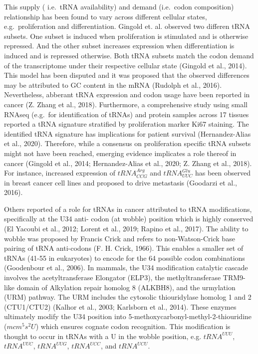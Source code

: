 \documentclass[12pt,openany]{book}
\begin{document}
This supply ( i.e.~tRNA availability) and demand (i.e.~codon
composition) relationship has been found to vary across different
cellular states, e.g.~proliferation and differentiation. Gingold et. al.
observed two differen tRNA subsets. One subset is induced when
proliferation is stimulated and is otherwise repressed. And the other
subset increases expression when differentiation is induced and is
repressed otherwise. Both tRNA subsets match the codon demand of the
transcriptome under their respective cellular state (Gingold et al.,
2014). This model has been disputed and it was proposed that the
observed differences may be attributed to GC content in the mRNA
(Rudolph et al., 2016). Nevertheless, abberant tRNA expression and codon
usage have been reported in cancer (Z. Zhang et al., 2018). Furthermore,
a comprehensive study using small RNAseq (e.g.~for identification of
tRNAs) and protein samples across 17 tissues reported a tRNA signature
stratified by proliferation marker Ki67 staining. The identified tRNA
signature has implications for patient survival (Hernandez-Alias et al.,
2020). Therefore, while a consensus on proliferation specific tRNA
subsets might not have been reached, emerging evidence implicates a role
thereof in cancer (Gingold et al., 2014; Hernandez-Alias et al., 2020;
Z. Zhang et al., 2018). For instance, increased expression of
\(tRNA_{CCG}^{Arg}\) and \(tRNA_{UUC}^{Glu}\) has been observed in
breast cancer cell lines and proposed to drive metastasis (Goodarzi et
al., 2016).

Others reported of a role for tRNAs in cancer attributed to tRNA
modifications, specifically at the U34 anti- codon (at wobble) position
which is highly conserved (El Yacoubi et al., 2012; Lorent et al., 2019;
Rapino et al., 2017). The ability to wobble was proposed by Francis
Crick and refers to non-Watson-Crick base pairing of tRNA anti-codons
(F. H. Crick, 1966). This enables a smaller set of tRNAs (41-55 in
eukaryotes) to encode for the 64 possible codon combinations (Goodenbour
et al., 2006). In mammals, the U34 modification catalytic cascade
involves the acetyltransferase Elongator (ELP3), the methyltransferase
TRM9-like domain of Alkylation repair homolog 8 (ALKBH8), and the
urmylation (URM) pathway. The URM includes the cytosolic thiouridylase
homolog 1 and 2 (CTU1/CTU2) (Kalhor et al., 2003; Karlsborn et al.,
2014). These enzymes ultimately modify the U34 position into
5-methoxycarbonyl-methyl-2-thiouridine (\(mcm^5s^2U\)) which ensures
cognate codon recognition. This modification is thought to occur in
tRNAs with a U in the wobble position, e.g. \(tRNA^{UUU}\),
\(tRNA^{UUC}\), \(tRNA^{UUG}\), \(tRNA^{UCC}\), and \(tRNA^{UCU}\).
\end{document}
